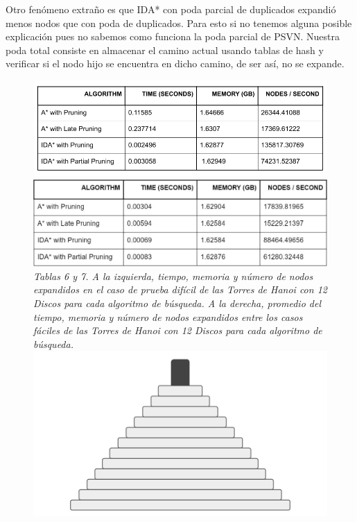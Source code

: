 \documentclass[a4paper,10pt]{article}
\begin{document}
    Otro fen\'omeno extra\~no es que IDA* con poda parcial de duplicados expandi\'o
    menos nodos que con poda de duplicados. Para esto si no tenemos alguna posible 
    explicaci\'on pues no sabemos como funciona la poda parcial de PSVN. Nuestra poda
    total consiste en almacenar el camino actual usando tablas de hash y verificar si
    el nodo hijo se encuentra en dicho camino, de ser as\'i, no se expande.
  
    \begin{figure}[t!]
      \centering
      \includegraphics[scale=0.3]{hanois12D/tabla1.png} 
      \includegraphics[scale=0.32]{hanois12D/12h_tabla_prom.jpg}\\
      \textit{\small{Tablas 6 y 7. A la izquierda, tiempo, memoria y n\'umero de nodos 
      expandidos en el caso de prueba dif\'icil de las Torres de Hanoi con 12 Discos para 
      cada algoritmo de b\'usqueda. A la derecha, promedio del tiempo, memoria y
      n\'umero de nodos expandidos entre los casos f\'aciles de las Torres de Hanoi
      con 12 Discos para cada algoritmo de b\'usqueda.}}\\
      \includegraphics[scale=0.2]{hanois12D/pdb.png}

\end{figure}
\end{document}
